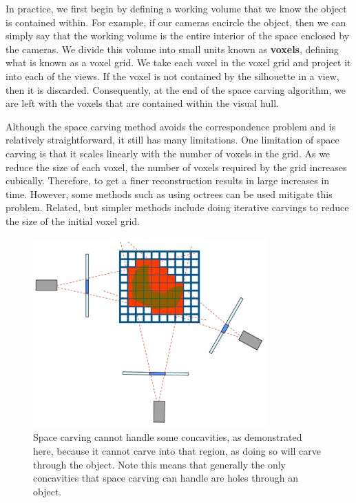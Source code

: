 \documentclass[a4paper, 12pt]{article}
\renewcommand\emph{\textbf}
\numberwithin{equation}{section}
\begin{document}
In practice, we first begin by defining a working volume that we know the object is contained within. For example, if our cameras encircle the object, then we can simply say that the working volume is the entire interior of the space enclosed by the cameras. We divide this volume into small units known as \emph{voxels}, defining what is known as a voxel grid. We take each voxel in the voxel grid and project it into each of the views. If the voxel is not contained by the silhouette in a view, then it is discarded. Consequently, at the end of the space carving algorithm, we are left with the voxels that are contained within the visual hull.

Although the space carving method avoids the correspondence problem and is relatively straightforward, it still has many limitations. One limitation of space carving is that it scales linearly with the number of voxels in the grid. As we reduce the size of each voxel, the number of voxels required by the grid increases cubically. Therefore, to get a finer reconstruction results in large increases in time. However, some methods such as using octrees can be used mitigate this problem. Related, but simpler methods include doing iterative carvings to reduce the size of the initial voxel grid. 

\begin{figure}[h!]
    \centering
    \includegraphics[width = 0.8\textwidth]{figures/concavity.png}
    \caption{Space carving cannot handle some concavities, as demonstrated here, because it cannot carve into that region, as doing so will carve through the object. Note this means that generally the only concavities that space carving can handle are holes through an object. }
    \label{fig:concavity}
\end{figure}
\end{document}
